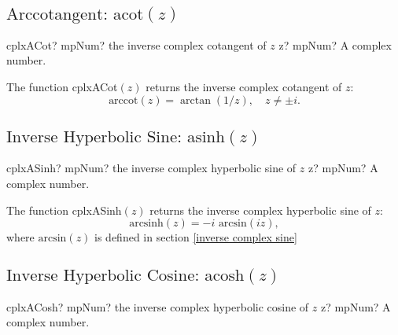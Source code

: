 \newpage
\subsection{\texorpdfstring{$\text{Arccotangent: acot}(z)$}{acot}}
\label{inverse complex cotangent}

\begin{mpFunctionsExtract}
	\mpFunctionOne
	{cplxACot? mpNum? the inverse complex cotangent of $z$}
	{z? mpNum? A complex number.}
\end{mpFunctionsExtract}

\vspace{0.3cm}
The function \textsf{cplxACot$(z)$} returns the inverse complex cotangent of $z$: 
\begin{equation}
	\text{arccot}(z) = \arctan(1/z), \quad z \neq \pm i.
\end{equation}






\newpage
\subsection{\texorpdfstring{$\text{Inverse Hyperbolic Sine: asinh}(z)$}{asinh}}
\label{inverse complex hyperbolic sine}

\begin{mpFunctionsExtract}
	\mpFunctionOne
	{cplxASinh? mpNum? the inverse complex hyperbolic sine of $z$}
	{z? mpNum? A complex number.}
\end{mpFunctionsExtract}

\vspace{0.3cm}
The function \textsf{cplxASinh$(z)$} returns the inverse complex hyperbolic sine of $z$: 
\begin{equation}
	\text{arcsinh}(z) = -i \text{ arcsin}(iz),
\end{equation}
where $\text{arcsin}(z)$ is defined in section \ref{inverse complex sine}







\newpage
\subsection{\texorpdfstring{$\text{Inverse Hyperbolic Cosine: acosh}(z)$}{acosh}}

\begin{mpFunctionsExtract}
	\mpFunctionOne
	{cplxACosh? mpNum? the inverse complex hyperbolic cosine of $z$}
	{z? mpNum? A complex number.}
\end{mpFunctionsExtract}

